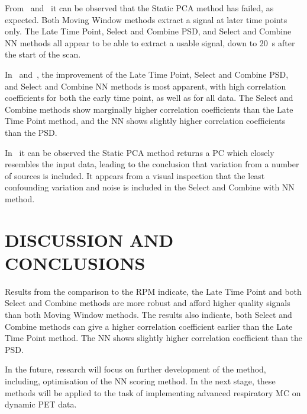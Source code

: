     From~ and~ it can be observed that the Static \acrshort{PCA} method has failed, as expected. Both Moving Window methods extract a signal at later time points only. The Late Time Point, Select and Combine \gls{PSD}, and Select and Combine \gls{NN} methods all appear to be able to extract a usable signal, down to \SI{20}{\second} after the start of the scan.
    
    In~ and~, the improvement of the Late Time Point, Select and Combine \gls{PSD}, and Select and Combine \gls{NN} methods is most apparent, with high correlation coefficients for both the early time point, as well as for all data. The Select and Combine methods show marginally higher correlation coefficients than the Late Time Point method, and the \gls{NN} shows slightly higher correlation coefficients than the \gls{PSD}.
    
    In~ it can be observed the Static \acrshort{PCA} method returns a \gls{PC} which closely resembles the input data, leading to the conclusion that variation from a number of sources is included. It appears from a visual inspection that the least confounding variation and noise is included in the Select and Combine with \gls{NN} method.


\section{DISCUSSION AND CONCLUSIONS} \label{sec:discussion_and_conclusions}
    Results from the comparison to the \gls{RPM} indicate, the Late Time Point and both Select and Combine methods are more robust and afford higher quality signals than both Moving Window methods. The results also indicate, both Select and Combine methods can give a higher correlation coefficient earlier than the Late Time Point method. The \gls{NN} shows slightly higher correlation coefficient than the \gls{PSD}.
    
    In the future, research will focus on further development of the method, including, optimisation of the \gls{NN} scoring method. In the next stage, these methods will be applied to the task of implementing advanced respiratory \acrlong{MC} on dynamic \acrshort{PET} data.